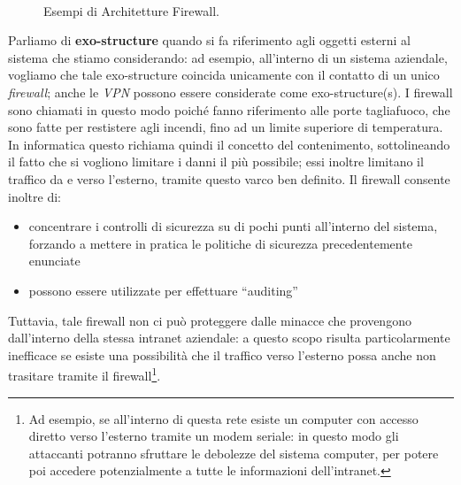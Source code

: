 \begin{figure}[p]
\\
\caption{Esempi di Architetture Firewall.}
\end{figure}
Parliamo di \textbf{exo-structure} quando si fa riferimento agli oggetti esterni al 
sistema che stiamo considerando: ad esempio, all'interno di un sistema aziendale,
vogliamo che tale exo-structure coincida unicamente con il contatto di un unico
\textit{firewall}; anche le \textit{VPN} possono essere considerate come exo-structure(s).
I firewall sono chiamati in questo modo poiché fanno riferimento alle porte
tagliafuoco, che sono fatte per restistere agli incendi, fino ad un limite 
superiore di temperatura. In informatica questo richiama quindi il concetto del
contenimento, sottolineando il fatto che si vogliono limitare i danni il più 
possibile; essi inoltre limitano il traffico da e verso l'esterno, tramite questo
varco ben definito. Il firewall consente inoltre di:
\begin{itemize}
\item concentrare i controlli di sicurezza su di pochi punti all'interno del
	sistema, forzando a mettere in pratica le politiche di sicurezza
	precedentemente enunciate
\item possono essere utilizzate per effettuare ``auditing''
\end{itemize}
Tuttavia, tale firewall non ci può proteggere dalle minacce che provengono
dall'interno della stessa intranet aziendale: a questo scopo risulta particolarmente
inefficace se esiste una possibilità che il traffico verso l'esterno possa anche
non trasitare tramite il firewall\footnote{Ad esempio, se all'interno di questa
rete esiste un computer con accesso diretto verso l'esterno tramite un modem
seriale: in questo modo gli attaccanti potranno sfruttare le debolezze del sistema
computer, per potere poi accedere potenzialmente a tutte le informazioni dell'intranet.}.
